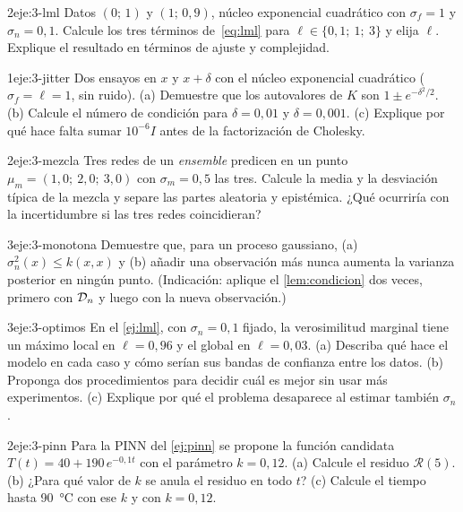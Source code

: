 \begin{ejercicio}{2}{eje:3-lml}
Datos $(0;\,1)$ y $(1;\,0{,}9)$, núcleo exponencial cuadrático con $\sigma_f=1$ y $\sigma_n=0{,}1$. Calcule los tres términos de~\eqref{eq:lml} para $\ell\in\{0{,}1;\ 1;\ 3\}$ y elija $\ell$. Explique el resultado en términos de ajuste y complejidad.
\end{ejercicio}

\begin{ejercicio}{1}{eje:3-jitter}
Dos ensayos en $x$ y $x+\delta$ con el núcleo exponencial cuadrático ($\sigma_f=\ell=1$, sin ruido). (a) Demuestre que los autovalores de $K$ son $1\pm e^{-\delta^2/2}$. (b) Calcule el número de condición para $\delta=0{,}01$ y $\delta=0{,}001$. (c) Explique por qué hace falta sumar $10^{-6}I$ antes de la factorización de Cholesky.
\end{ejercicio}

\begin{ejercicio}{2}{eje:3-mezcla}
Tres redes de un \emph{ensemble} predicen en un punto $\mu_m=(1{,}0;\ 2{,}0;\ 3{,}0)$ con $\sigma_m=0{,}5$ las tres. Calcule la media y la desviación típica de la mezcla y separe las partes aleatoria y epistémica. ¿Qué ocurriría con la incertidumbre si las tres redes coincidieran?
\end{ejercicio}

\begin{ejercicio}{3}{eje:3-monotona}
Demuestre que, para un proceso gaussiano, (a) $\sigma_n^2(x)\le k(x,x)$ y (b) añadir una observación más nunca aumenta la varianza posterior en ningún punto. (Indicación: aplique el \cref{lem:condicion} dos veces, primero con $\mathcal{D}_n$ y luego con la nueva observación.)
\end{ejercicio}

\begin{ejercicio}{3}{eje:3-optimos}
En el \cref{ej:lml}, con $\sigma_n=0{,}1$ fijado, la verosimilitud marginal tiene un máximo local en $\ell=0{,}96$ y el global en $\ell=0{,}03$. (a) Describa qué hace el modelo en cada caso y cómo serían sus bandas de confianza entre los datos. (b) Proponga dos procedimientos para decidir cuál es mejor sin usar más experimentos. (c) Explique por qué el problema desaparece al estimar también $\sigma_n$.
\end{ejercicio}

\begin{ejercicio}{2}{eje:3-pinn}
Para la PINN del \cref{ej:pinn} se propone la función candidata $T(t)=40+190\,e^{-0{,}1t}$ con el parámetro $k=0{,}12$. (a) Calcule el residuo $\mathcal R(5)$. (b) ¿Para qué valor de $k$ se anula el residuo en todo $t$? (c) Calcule el tiempo hasta 90~°C con ese $k$ y con $k=0{,}12$.
\end{ejercicio}
